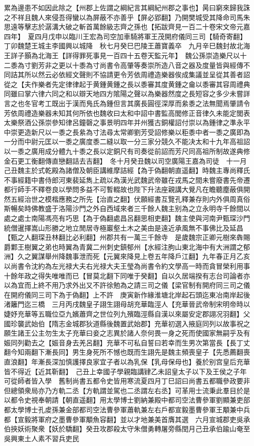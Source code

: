 累為邊患不如因此除之【州郡上佐謂之綱紀言其綱紀州郡之事也】昺曰窮來歸我誅之不祥且魏人來侵吾得蠻以為屏蔽不亦善乎【屏必郢翻】乃開樊城受其降命司馬朱思遠等擊志於潺溝大破之斬首萬餘級志齊之孫也【拓跋齊見一百二十卷宋文帝元嘉四年】　夏四月戊申以臨川王宏為司空加車騎將軍王茂開府儀同三司【騎奇寄翻】　丁卯魏楚王城主李國興以城降　秋七月癸巳巴陵王蕭寶義卒　九月辛巳魏封故北海王詳子顥為北海王【詳得罪死事見一百四十五卷天監元年】　魏公孫崇造樂尺以十二黍為寸劉芳非之更以十黍為寸尚書令高肇等奏崇所造八音之器及度量皆與經傳不同詰其所以然云必依經文聲則不協請更令芳依周禮造樂器俟成集議並呈從其善者詔從之【夫作樂者先定律律起于黄鍾黄鍾之長以黍審其度黄鍾之龠以黍審其容周禮典同雖曰掌六律六同之和以辯天地四方隂陽之聲以為樂器然度之長短容之多少未嘗詳言之也冬官考工既出于漢而鳬氏為鍾但言其廣長圓徑深厚而絫黍之法無聞焉肇請令芳依周禮造樂器未知其何所依也魏收曰太和中詔中書監高閭修正音律久未能定閭表太樂祭酒公孫崇參知律呂鐘磬之事景明四年并州獲古銅權詔付崇以為鍾律之準永平中崇更造新尺以一黍之長絫為寸法尋太常卿劉芳受詔修樂以秬黍中者一黍之廣即為一分而中尉元匡以一黍之廣度黍二縫以取一分三家分競久不能决太和十九年高祖詔以一黍之廣用成分體九十黍之長以定銅尺有司奏從前詔而芳尺同高祖所制故遂典修金石更工衡翻傳直戀翻詰去吉翻】　冬十月癸丑魏以司空廣陽王嘉為司徒　十一月己丑魏主於式乾殿為諸僧及朝臣講維摩詰經【為于偽翻朝直遥翻】時魏主專尚釋氏不事經籍中書侍郎河東裴延雋上疏以為漢光武魏武帝雖在戎馬之間未嘗廢書先帝遷都行師手不釋卷良以學問多益不可暫輟故也陛下升法座親講大覺凡在瞻聽塵蔽俱開然五經治世之模楷應務之所先【治直之翻】伏願經書互覽孔釋兼存則内外俱周真俗斯暢矣時佛教盛于洛陽沙門之外自西域來者三千餘人魏主别為之立永明寺千餘間以處之處士南陽馮亮有巧思【為于偽翻處昌呂翻思相吏翻】魏主使與河南尹甄琛沙門統僧暹擇嵩山形勝之地立閒居寺極巖壑土木之美由是遠近承風無不事佛比及延昌【甄之人翻琛丑林翻比必利翻】州郡共有一萬三千餘寺　是歲魏宗正卿元樹來犇賜爵鄴王樹翼之弟也時翼為青冀二州刺史鎮郁州【水經注朐山東北海中有大洲謂之郁洲】久之翼謀舉州降魏事泄而死【元翼來降見上卷五年降戶江翻】九年春正月乙亥以尚書令沈約為左光禄大夫右光禄大夫王瑩為尚書令約文學高一時而貪冒榮利用事十餘年政之得失唯唯而已【冒莫北翻下同唯于癸翻】自以久居端揆有志台司論者亦以為宜而上終不用乃求外出又不許徐勉為之請三司之儀【梁官制有開府同三司之儀在開府儀同三司下為于偽翻】上不許　庚寅新作緣淮塘北岸起石頭迄東冶南岸起後渚籬門迄三橋　三月丙戌魏皇子詡生詡母胡充華臨涇人【充華晉武帝制宋明帝時以婕妤充華等五職位亞九嬪蕭齊之世位列九殯臨涇縣自漢以來屬安定郡詡况羽翻】父國珍襲武始伯【隋志金城郡狄道縣後魏置武始郡】充華初選入掖庭同列以故事祝之願生諸王公主勿生太子充華曰妾之志異於諸人奈何畏一身之死而使國家無嗣乎及有娠同列勸去之【娠音身去羌呂翻】充華不可私自誓曰若幸而生男次第當長【長丁丈翻今知兩翻下漸長同】男生身死所不憾也既而生詡先是魏主頻喪皇子【先悉薦翻喪直浪翻】年漸長深加慎護擇良家宜子者以為乳保【乳母保母也】養於别宫皇后充華皆不得近【近其靳翻】　己丑上幸國子學親臨講肄乙未詔皇太子以下及王侯之子年可從師者皆入學　舊制尚書五都令史皆用寒流夏四月丁巳詔曰尚書五都職參政要非但總領衆局亦乃方軌二丞【方軌謂並駕也二丞謂左右丞】可革用士流秉此羣目於是以都令史視奉朝請【朝直遥翻】用太學博士劉納兼殿中都司空法曹參軍劉顯兼吏部都太學博士孔䖍孫兼金部都司空法曹參軍蕭軌兼左右戶都宣毅墨曹參軍王顒兼中兵都【宣毅將軍府之墨曹參軍顒魚容翻】並以才地兼美首膺其選　六月宣城郡吏吳承伯挾妖術聚衆【妖於驕翻】癸丑攻郡殺太守朱僧勇轉屠旁縣閏月己丑承伯踰山奄至吳興東土人素不習兵吏民